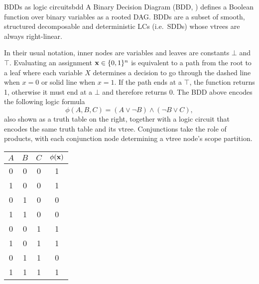 \begin{example}[sidebyside,lefthand width=0.55\textwidth]{BDDs as logic circuits}{bdd}
  A Binary Decision Diagram (BDD, \cite{bryant86}) defines a Boolean function over binary variables
  as a rooted DAG. BDDs are a subset of smooth, structured decomposable and deterministic LCs (i.e.\
  SDDs) whose vtrees are always right-linear.
  \begin{center}
  \end{center}
  In their usual notation, inner nodes are variables and leaves are constants $\bot$ and $\top$.
  Evaluating an assignment $\mathbf{x}\in\{0,1\}^n$ is equivalent to a path from the root to a
  leaf where each variable $X$ determines a decision to go through the dashed line when $x=0$ or
  solid line when $x=1$. If the path ends at a $\top$, the function returns 1, otherwise it must
  end at a $\bot$ and therefore returns 0. The BDD above encodes the following logic formula
  \begin{equation}
    \phi(A,B,C)=(A\vee\neg B)\wedge(\neg B\vee C),
  \end{equation}
  also shown as a truth table on the right, together with a logic circuit that encodes the same
  truth table and its vtree. Conjunctions take the role of products, with each conjunction node
  determining a vtree node's scope partition.
  \tcblower
  \small%
  \begin{center}
    \begin{tabular}{ccc|c}
      \hline
      $A$ & $B$ & $C$ & $\phi(\mathbf{x})$\\
      \hline
      0 & 0 & 0 & 1\\
      1 & 0 & 0 & 1\\
      0 & 1 & 0 & 0\\
      1 & 1 & 0 & 0\\
      0 & 0 & 1 & 1\\
      1 & 0 & 1 & 1\\
      0 & 1 & 1 & 0\\
      1 & 1 & 1 & 1\\
      \hline
    \end{tabular}


\end{center}
\end{example}
